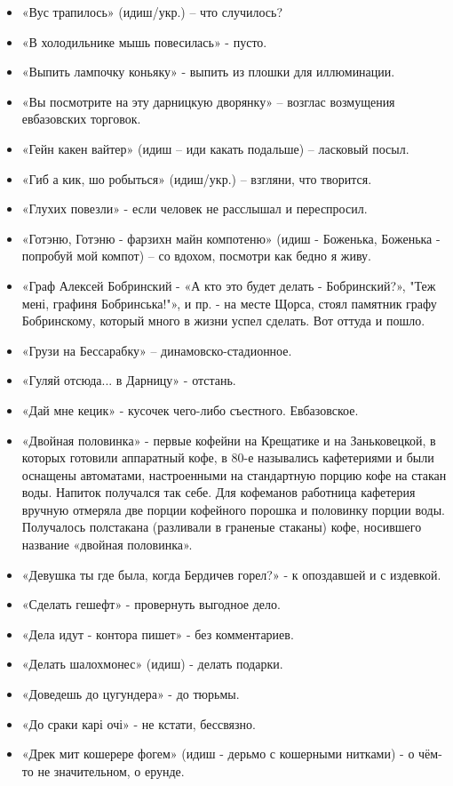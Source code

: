\begin{itemize}
\item  «Вус трапилось» (идиш/укр.) – что случилось?
\item  «В холодильнике мышь повесилась» - пусто.
\item  «Выпить лампочку коньяку» - выпить из плошки для иллюминации.
\item  «Вы посмотрите на эту дарницкую дворянку» – возглас возмущения евбазовских торговок.
\item  «Гейн какен вайтер» (идиш – иди какать подальше) – ласковый посыл.
\item  «Гиб а кик, шо робыться» (идиш/укр.) – взгляни, что творится.
\item  «Глухих повезли» - если человек не расслышал и переспросил.
\item  «Готэню, Готэню - фарзихн майн компотеню» (идиш - Боженька, Боженька - попробуй мой компот) – со вдохом, посмотри как бедно я живу.
\item  «Граф Алексей Бобринский - «А кто это будет делать - Бобринский?», "Теж мені, графиня Бобринська!"», и пр. - на месте Щорса, стоял памятник графу Бобринскому, который много в жизни успел сделать. Вот оттуда и пошло.
\item  «Грузи на Бессарабку» – динамовско-стадионное.
\item  «Гуляй отсюда... в Дарницу» - отстань.
\item  «Дай мне кецик» - кусочек чего-либо съестного. Евбазовское.
\item  «Двойная половинка» - первые кофейни на Крещатике и на Заньковецкой, в которых готовили аппаратный кофе, в 80-е назывались кафетериями и были оснащены автоматами, настроенными на стандартную порцию кофе на стакан воды. Напиток получался так себе. Для кофеманов работница кафетерия вручную отмеряла две порции кофейного порошка и половинку порции воды. Получалось полстакана (разливали в граненые стаканы) кофе, носившего название «двойная половинка».
\item  «Девушка ты где была, когда Бердичев горел?» - к опоздавшей и с издевкой.
\item  «Сделать гешефт» - провернуть выгодное дело.
\item  «Дела идут - контора пишет» - без комментариев.
\item  «Делать шалохмонес» (идиш) - делать подарки.
\item  «Доведешь до цугундера» - до тюрьмы.
\item  «До сраки карі очі» - не кстати, бессвязно.
\item  «Дрек мит кошерере фогем» (идиш - дерьмо с кошерными нитками) - о чём-то не значительном, о ерунде.

\end{itemize}
